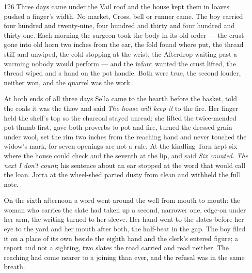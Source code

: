 
\scenebreak


\scenebreak


\scenebreak

\CRtailpiece
\begin{CRchronicle}{126}
Three days came under the Vail roof and the house kept them in loaves pushed a finger’s width. No market, Cross, bell or runner came. The boy carried four hundred and twenty-nine, four hundred and thirty and four hundred and thirty-one. Each morning the surgeon took the body in its old order — the crust gone into old horn two inches from the ear, the fold found where put, the thread stiff and unwiped, the cold stopping at the wrist, the Afterdrop waiting past a warming nobody would perform — and the infant wanted the crust lifted, the thread wiped and a hand on the pot handle. Both were true, the second louder, neither won, and the quarrel was the work.

At both ends of all three days Sella came to the hearth before the basket, told the coals it was the thaw and said \emph{The house will keep it} to the fire. Her finger held the shelf’s top so the charcoal stayed unread; she lifted the twice-mended pot thumb-first, gave both proverbs to pot and fire, turned the dressed grain under wool, set the rim two inches from the reaching hand and never touched the widow’s mark, for seven openings are not a rule. At the kindling Tarn kept six where the house could check and the seventh at the lip, and said \emph{Six counted. The next I don’t count}; his sentence about an ear stopped at the word that would call the loan. Jorra at the wheel-shed parted dusty from clean and withheld the full note.

On the sixth afternoon a word went around the well from mouth to mouth: the woman who carries the slate had taken up a second, narrower one, edge-on under her arm, the writing turned to her sleeve. Her hand went to the slates before her eye to the yard and her mouth after both, the half-beat in the gap. The boy filed it on a place of its own beside the eighth hand and the clerk’s entered figure; a report and not a sighting, two slates the road carried and read neither. The reaching had come nearer to a joining than ever, and the refusal was in the same breath.


\end{CRchronicle}
